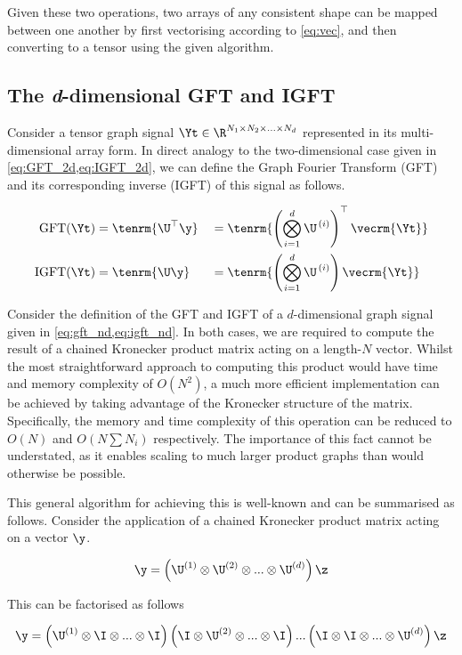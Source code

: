 Given these two operations, two arrays of any consistent shape can be mapped between one another by first vectorising according to \cref{eq:vec}, and then converting to a tensor using the given algorithm.

\subsection{The \textit{d}-dimensional GFT and IGFT}

\label{sec:GSP_dd}

Consider a tensor graph signal $\Yt \in \R^{N_1 \times N_2 \times ... \times N_d}$ represented in its multi-dimensional array form. In direct analogy to the two-dimensional case given in \cref{eq:GFT_2d,eq:IGFT_2d}, we can define the Graph Fourier Transform (GFT) and its corresponding inverse (IGFT) of this signal as follows. 

\begin{alignat}{2}
\label{eq:gft_nd}
    \text{GFT}(\Yt) & = \tenrm{\U^\top \y} && = \tenrm{\left(  \bigotimes_{i=1}^d  \U^{\,(i)} \right)^\top \vecrm{\Yt} } \\
\label{eq:igft_nd}
    \text{IGFT}(\Yt) & = \tenrm{\U \y} && = \tenrm{\left(  \bigotimes_{i=1}^d  \U^{\,(i)} \right) \vecrm{\Yt} }
\end{alignat}

Consider the definition of the GFT and IGFT of a $d$-dimensional graph signal given in \cref{eq:gft_nd,eq:igft_nd}. In both cases, we are required to compute the result of a chained Kronecker product matrix acting on a length-$N$ vector. Whilst the most straightforward approach to computing this product would have time and memory complexity of $O(N^2)$, a much more efficient implementation can be achieved by taking advantage of the Kronecker structure of the matrix. Specifically, the memory and time complexity of this operation can be reduced to $O(N)$ and $O(N\sum N_i)$ respectively. The importance of this fact cannot be understated, as it enables scaling to much larger product graphs than would otherwise be possible. 

This general algorithm for achieving this is well-known and can be summarised as follows. Consider the application of a chained Kronecker product matrix acting on a vector $\y$. 

$$
\y = \left( \U^{(1)} \otimes \U^{(2)} \otimes ... \otimes \U^{(d)}\right) \z
$$

This can be factorised as follows

$$
\y = \left( \U^{(1)} \otimes \I \otimes ... \otimes \I \right)\left( \I \otimes \U^{(2)} \otimes ... \otimes \I \right) ... \left( \I \otimes \I \otimes ... \otimes \U^{(d)} \right) \z
$$

